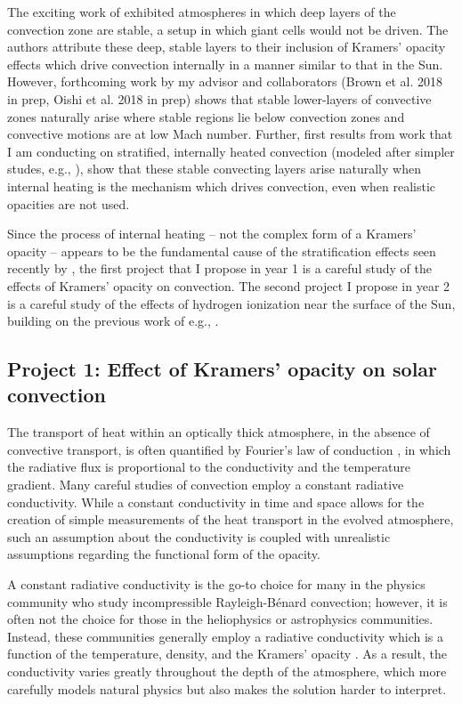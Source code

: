 \documentclass[aasms,12pt]{article}
\newcommand{\RB}{Rayleigh-B\'{e}nard }
\begin{document}
The exciting work of \cite{kapyla&all2017}
exhibited atmospheres in which deep layers of the convection
zone are stable, a setup in which giant cells would not be driven.  
The authors attribute these deep, stable layers to their inclusion of Kramers' opacity
effects which drive convection internally in a manner similar to that in the Sun.  
However, forthcoming work by my advisor and collaborators (Brown et al. 2018 in prep, Oishi et al. 2018 in prep) 
shows that 
stable lower-layers of convective zones naturally arise where stable regions lie below convection
zones and convective motions are at low Mach number.
Further, first results from work that I am conducting on stratified, internally
heated convection (modeled after simpler studes, e.g., \cite{goluskin&spiegel2012}),
show that these stable convecting layers arise naturally when internal heating is the mechanism which
drives convection, even when realistic opacities are not used.

Since the process of internal heating -- not the complex form of a Kramers' opacity --
appears to be the fundamental cause of the stratification effects seen recently by \cite{kapyla&all2017},
the first project that I propose in year 1 is a careful study of the effects of Kramers' opacity on convection.
The second project I propose in year 2 is a careful study of the effects of hydrogen ionization near the surface
of the Sun, building on the previous work of e.g., \cite{rast&toomre1993}.

\vspace{-0.25cm}
\subsection{Project 1: Effect of Kramers' opacity on solar convection}
\vspace{-0.15cm}
The transport of heat within an optically thick atmosphere, in the absence of convective transport,
is often quantified by Fourier's law of conduction \citep{lecoanet&all2014}, in which the radiative
flux is proportional to the conductivity and the temperature gradient.  
Many careful studies of convection employ a constant radiative conductivity.
While a constant conductivity in time and space allows for the creation of simple measurements of the
heat transport in the evolved atmosphere, such an assumption about
the conductivity is coupled with unrealistic assumptions regarding the functional form of the opacity.  

A constant radiative
conductivity is the go-to choice for many in the physics community who study incompressible
\RB convection; however, it is often not the choice for those in the heliophysics or astrophysics
communities.  Instead, these communities generally employ a radiative conductivity which is a function
of the temperature, density, and the Kramers' opacity \citep{barekat&brandenburg2014, brandenburg2016, kapyla&all2017}.
As a result, the conductivity varies greatly throughout the depth of the atmosphere, which 
more carefully models natural physics but also makes the solution harder to interpret.
\end{document}
